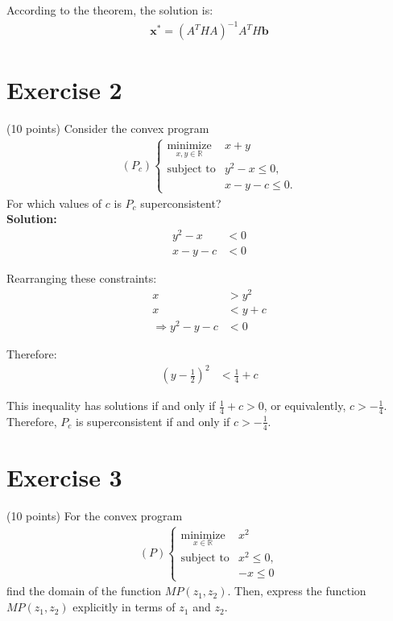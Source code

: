 \documentclass{article}
\begin{document}
According to the theorem, the solution is:
\begin{align*}
\mathbf{x}^* = (A^T H A)^{-1} A^T H \mathbf{b}
\end{align*}

\newpage

\section*{Exercise 2}
(10 points) Consider the convex program
\begin{align*}
(P_c) \begin{cases}
\underset{x,y\in\mathbb{R}}{\text{minimize}} & x + y \\
\text{subject to} & y^2 - x \leq 0, \\
& x - y - c \leq 0.
\end{cases}
\end{align*}
For which values of $c$ is $P_c$ superconsistent? \\

\textbf{Solution:}
\begin{align*}
y^2 - x &< 0\\
x - y - c &< 0
\end{align*}

Rearranging these constraints:
\begin{align*}
x &> y^2\\
x &< y + c\\
\Rightarrow y^2 - y - c &< 0
\end{align*}

Therefore:
\begin{align*}
\left(y - \frac{1}{2}\right)^2 &< \frac{1}{4} + c
\end{align*}

This inequality has solutions if and only if $\frac{1}{4} + c > 0$, or equivalently, $c > -\frac{1}{4}$. \\

Therefore, $P_c$ is superconsistent if and only if $c > -\frac{1}{4}$.

\newpage

\section*{Exercise 3}
(10 points) For the convex program
\begin{align*}
(P) \begin{cases}
\underset{x\in\mathbb{R}}{\text{minimize}} & x^2 \\
\text{subject to} & x^2 \leq 0, \\
& -x \leq 0
\end{cases}
\end{align*}
find the domain of the function $MP(z_1, z_2)$. Then, express the function $MP(z_1, z_2)$ explicitly in terms of $z_1$ and $z_2$. \\
\end{document}
